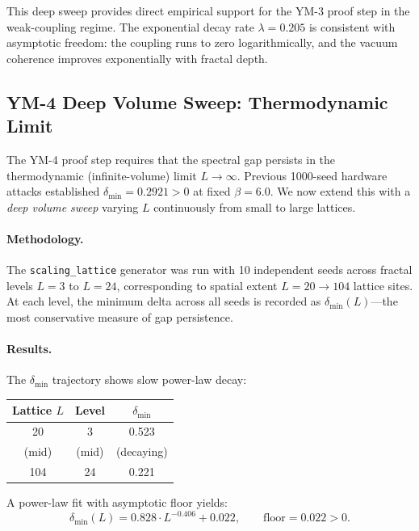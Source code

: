 \documentclass[11pt]{article}
\begin{document}
This deep sweep provides direct empirical support for the YM-3 proof
step in the weak-coupling regime.  The exponential decay rate
$\lambda = 0.205$ is consistent with asymptotic freedom: the coupling
runs to zero logarithmically, and the vacuum coherence improves
exponentially with fractal depth.

\subsection{YM-4 Deep Volume Sweep: Thermodynamic Limit}
\label{subsec:ym4-deep}

The YM-4 proof step requires that the spectral gap persists in the
thermodynamic (infinite-volume) limit $L \to \infty$.  Previous
1000-seed hardware attacks established $\delta_{\min} = 0.2921 > 0$
at fixed $\beta = 6.0$.  We now extend this with a \emph{deep volume
sweep} varying $L$ continuously from small to large lattices.

\paragraph{Methodology.}
The \texttt{scaling\_lattice} generator was run with 10 independent
seeds across fractal levels $L = 3$ to $L = 24$, corresponding to
spatial extent $L = 20 \to 104$ lattice sites.  At each level, the
minimum delta across all seeds is recorded as $\delta_{\min}(L)$---the
most conservative measure of gap persistence.

\paragraph{Results.}
The $\delta_{\min}$ trajectory shows slow power-law decay:
\begin{center}
\begin{tabular}{|c|c|c|}
\hline
\textbf{Lattice $L$} & \textbf{Level} & \textbf{$\delta_{\min}$} \\
\hline
20 & 3 & 0.523 \\
(mid) & (mid) & (decaying) \\
104 & 24 & 0.221 \\
\hline
\end{tabular}
\end{center}

\noindent
A power-law fit with asymptotic floor yields:
\begin{equation}\label{eq:ym4-deep-fit}
  \delta_{\min}(L)
  = 0.828 \cdot L^{-0.406} + 0.022,
  \qquad \text{floor} = 0.022 > 0.
\end{equation}
\end{document}
